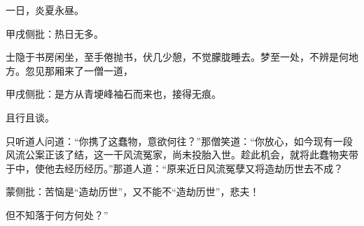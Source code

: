 \begin{parag}
    一日，炎夏永昼。\begin{note}甲戌侧批：热日无多。\end{note}士隐于书房闲坐，至手倦抛书，伏几少憩，不觉朦胧睡去。梦至一处，不辨是何地方。忽见那厢来了一僧一道，\begin{note}甲戌侧批：是方从青埂峰袖石而来也，接得无痕。\end{note}且行且谈。
\end{parag}


\begin{parag}
    只听道人问道：“你携了这蠢物，意欲何往？”那僧笑道：“你放心，如今现有一段风流公案正该了结，这一干风流冤家，尚未投胎入世。趁此机会，就将此蠢物夹带于中，使他去经历经历。”那道人道：“原来近日风流冤孽又将造劫历世去不成？\begin{note}蒙侧批：苦恼是“造劫历世”，又不能不“造劫历世”，悲夫！\end{note}但不知落于何方何处？”
\end{parag}



